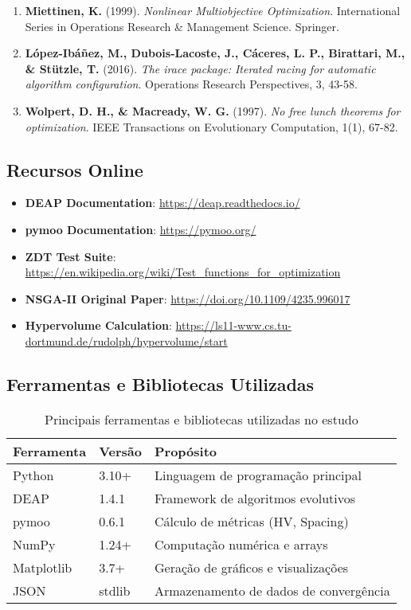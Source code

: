 \begin{enumerate}
    \item \textbf{Miettinen, K.} (1999). \textit{Nonlinear Multiobjective Optimization}. International Series in Operations Research \& Management Science. Springer.
    
    \item \textbf{López-Ibáñez, M., Dubois-Lacoste, J., Cáceres, L. P., Birattari, M., \& Stützle, T.} (2016). \textit{The irace package: Iterated racing for automatic algorithm configuration}. Operations Research Perspectives, 3, 43-58.
    
    \item \textbf{Wolpert, D. H., \& Macready, W. G.} (1997). \textit{No free lunch theorems for optimization}. IEEE Transactions on Evolutionary Computation, 1(1), 67-82.
\end{enumerate}

\subsection{Recursos Online}

\begin{itemize}
    \item \textbf{DEAP Documentation}: \url{https://deap.readthedocs.io/}
    \item \textbf{pymoo Documentation}: \url{https://pymoo.org/}
    \item \textbf{ZDT Test Suite}: \url{https://en.wikipedia.org/wiki/Test_functions_for_optimization}
    \item \textbf{NSGA-II Original Paper}: \url{https://doi.org/10.1109/4235.996017}
    \item \textbf{Hypervolume Calculation}: \url{https://ls11-www.cs.tu-dortmund.de/rudolph/hypervolume/start}
\end{itemize}

\subsection{Ferramentas e Bibliotecas Utilizadas}

\begin{table}[H]
\centering
\caption{Principais ferramentas e bibliotecas utilizadas no estudo}
\begin{tabular}{@{}llp{6cm}@{}}
\toprule
\textbf{Ferramenta} & \textbf{Versão} & \textbf{Propósito} \\
\midrule
Python & 3.10+ & Linguagem de programação principal \\
DEAP & 1.4.1 & Framework de algoritmos evolutivos \\
pymoo & 0.6.1 & Cálculo de métricas (HV, Spacing) \\
NumPy & 1.24+ & Computação numérica e arrays \\
Matplotlib & 3.7+ & Geração de gráficos e visualizações \\
JSON & stdlib & Armazenamento de dados de convergência \\
\bottomrule
\end{tabular}
\end{table}

